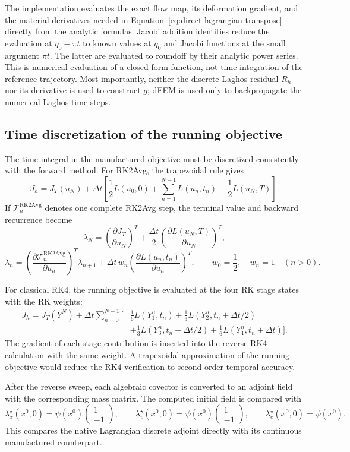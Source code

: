 \documentclass[11pt]{article}
\begin{document}
The implementation evaluates the exact flow map, its deformation gradient,
and the material derivatives needed in
Equation~\eqref{eq:direct-lagrangian-transpose} directly from the analytic
formulas.  Jacobi addition identities reduce the evaluation at
$q_0-\pi t$ to known values at $q_0$ and Jacobi functions at the small
argument $\pi t$.  The latter are evaluated to roundoff by their analytic
power series.  This is numerical evaluation of a closed-form function, not
time integration of the reference trajectory.  Most importantly, neither
the discrete Laghos residual $R_h$ nor its derivative is used to construct
$g$; dFEM is used only to backpropagate the numerical Laghos time steps.

\subsection{Time discretization of the running objective}

The time integral in the manufactured objective must be discretized
consistently with the forward method.  For RK2Avg, the trapezoidal rule gives
\[
 J_h=J_T(u_N)+\Delta t\left[
 \frac12L(u_0,0)+\sum_{n=1}^{N-1}L(u_n,t_n)
 +\frac12L(u_N,T)\right].
\]
If $\mathcal T_n^{\mathrm{RK2Avg}}$ denotes one complete RK2Avg step, the
terminal value and backward recurrence become
\[
 \lambda_N=\left(\frac{\partial J_T}{\partial u_N}\right)^T
 +\frac{\Delta t}{2}
 \left(\frac{\partial L(u_N,T)}{\partial u_N}\right)^T,
\]
\[
 \lambda_n=
 \left(\frac{\partial\mathcal T_n^{\mathrm{RK2Avg}}}
 {\partial u_n}\right)^T\lambda_{n+1}
 +\Delta t\,w_n
 \left(\frac{\partial L(u_n,t_n)}{\partial u_n}\right)^T,
 \qquad w_0=\frac12,\quad w_n=1\quad(n>0).
\]

For classical RK4, the running objective is evaluated at the four RK stage
states with the RK weights:
\begin{align*}
 J_h=J_T(Y^N)+\Delta t\sum_{n=0}^{N-1}\bigg[&
 \frac16L(Y_1^n,t_n)
 +\frac13L(Y_2^n,t_n+\Delta t/2)\\
 &+\frac13L(Y_3^n,t_n+\Delta t/2)
 +\frac16L(Y_4^n,t_n+\Delta t)\bigg].
\end{align*}
The gradient of each stage contribution is inserted into the reverse RK4
calculation with the same weight.  A trapezoidal approximation of the
running objective would reduce the RK4 verification to second-order temporal
accuracy.

After the reverse sweep, each algebraic covector is converted to an adjoint
field with the corresponding mass matrix.  The computed initial field is
compared with
\[
 \lambda_x^\star(x^0,0)=\psi(x^0)\begin{pmatrix}1\\-1\end{pmatrix},
 \qquad
 \lambda_v^\star(x^0,0)=\psi(x^0)\begin{pmatrix}1\\-1\end{pmatrix},
 \qquad
 \lambda_e^\star(x^0,0)=\psi(x^0).
\]
This compares the native Lagrangian discrete adjoint directly with its
continuous manufactured counterpart.
\end{document}
